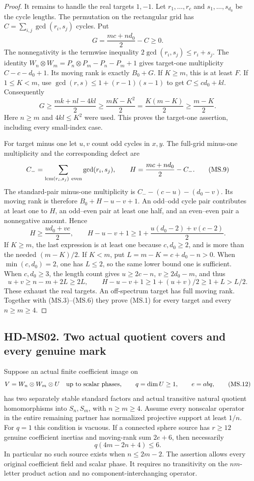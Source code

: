 \begin{proof}
It remains to handle the real targets $1,-1$.
Let $r_1,\ldots,r_c$ and $s_1,\ldots,s_{d_0}$ be the cycle
lengths. The permutation on the rectangular grid has
$C=\sum_{i,j}\gcd(r_i,s_j)$ cycles. Put
\[
 G=\frac{mc+nd_0}{2}-C\ge0.
 \tag{MS.7}
\]
The nonnegativity is the termwise inequality
$2\gcd(r_i,s_j)\le r_i+s_j$.
The identity $W_n\otimes W_m=P_n\otimes P_m-P_n-P_m+1$
gives target-one multiplicity $C-c-d_0+1$. Its moving rank is
exactly $B_0+G$. If $K\ge m$, this is at least $F$.
If $1\le K<m$, use
$\gcd(r,s)\le1+(r-1)(s-1)$ to get
$C\le cd_0+kl$. Consequently
\[
 G\ge\frac{mk+nl-4kl}{2}
   \ge\frac{mK-K^2}{2}
   =\frac{K(m-K)}2\ge\frac{m-K}{2}.
 \tag{MS.8}
\]
Here $n\ge m$ and $4kl\le K^2$ were used. This proves
the target-one assertion, including every small-index case.

For target minus one let $u,v$ count odd cycles in $x,y$.
The full-grid minus-one multiplicity and the corresponding
defect are
\[
 C_- =\sum_{\operatorname{lcm}(r_i,s_j)\ {\rm even}}
                \gcd(r_i,s_j),\qquad
 H=\frac{mc+nd_0}{2}-C_-.
 \tag{MS.9}
\]
The standard-pair minus-one multiplicity is
$C_--(c-u)-(d_0-v)$. Its moving rank is therefore
$B_0+H-u-v+1$. An odd--odd cycle pair contributes at least
one to $H$, an odd--even pair at least one half, and an
even--even pair a nonnegative amount. Hence
\[
 H\ge\frac{u d_0+v c}{2},\qquad
 H-u-v+1\ge1+\frac{u(d_0-2)+v(c-2)}2.
 \tag{MS.10}
\]
If $K\ge m$, the last expression is at least one because
$c,d_0\ge2$, and is more than the needed $(m-K)/2$.
If $K<m$, put $L=m-K=c+d_0-n>0$.
When $\min(c,d_0)=2$, one has $L\le2$, so the same lower
bound one is sufficient. When $c,d_0\ge3$, the length count
gives $u\ge2c-n$, $v\ge2d_0-m$, and thus
\[
 u+v\ge n-m+2L\ge2L,
 \qquad H-u-v+1\ge1+(u+v)/2\ge1+L>L/2.
 \tag{MS.11}
\]
These exhaust the real targets. An off-spectrum target has
full moving rank. Together with (MS.3)--(MS.6) they prove
(MS.1) for every target and every $n\ge m\ge4$.
\end{proof}

\subsection*{HD-MS02. Two actual quotient covers and every genuine mark}

\begin{theorem}[HD-MS02]
Suppose an actual finite coefficient image on
\[
 V=W_n\otimes W_m\otimes U\quad\hbox{up to scalar phases},
 \qquad q=\dim U\ge1,\qquad e=abq,
 \tag{MS.12}
\]
has two separately stable standard factors and actual transitive
natural quotient homomorphisms into $S_n,S_m$, with $n\ge m\ge4$.
Assume every nonscalar operator in the entire remaining partner
has normalized projective support at least $1/n$. For $q=1$
this condition is vacuous. If a connected sphere source has
$r\ge12$ genuine coefficient inertias and moving-rank sum $2e+6$,
then necessarily
\[
                       q(4m-2n+4)\le6.
 \tag{MS.13}
\]
In particular no such source exists when $n\le2m-2$.
The assertion allows every original coefficient field and scalar
phase. It requires no transitivity on the $nm$-letter product
action and no component-interchanging operator.
\end{theorem}

